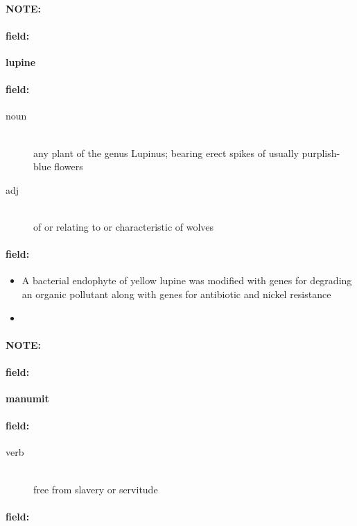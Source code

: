 \documentclass[12pt]{article}
\newenvironment{note}{\paragraph{NOTE:}}{}
\newenvironment{field}{\paragraph{field:}}{}
\begin{document}
\begin{note}
\begin{field}
\textbf{\large lupine}
\end{field}


\begin{field}
\begin{description}
\item[noun] \hfill \\ 
any plant of the genus Lupinus; bearing erect spikes of usually purplish-blue flowers

\item[adj] \hfill \\ 
of or relating to or characteristic of wolves

\end{description}
\end{field}

\begin{field}
\begin{itemize}
\item A bacterial endophyte of yellow lupine was modified with genes for degrading an organic pollutant along with genes for antibiotic and nickel resistance
\item 
\end{itemize}
\end{field}
\end{note}
\begin{note}
\begin{field}
\textbf{\large manumit}
\end{field}


\begin{field}
\begin{description}
\item[verb] \hfill \\ 
free from slavery or servitude

\end{description}
\end{field}

\begin{field}
\end{field}
\end{note}
\end{document}
